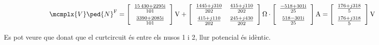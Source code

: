 \begin{exemple}
    \[
    \mcmplx{V}\ped{N}^{\text{F}} =
    \begin{bmatrix}\begin{array}{c}
    \frac{\complexnum{15430+j2295}}{101} \\[2mm]
    \frac{\complexnum{3390+j2085}}{101}
	\end{array}\end{bmatrix}\unit{V} +
	\begin{bmatrix}\begin{array}{cc}
         \frac{1445 + j 310}{202} & \frac{415 + j 110}{202} \\[2mm]
         \frac{415 + j 110}{202} & \frac{245 + j 430}{202}
    \end{array}\end{bmatrix}\unit{\ohm} \cdot
    \begin{bmatrix}\begin{array}{c}
        \frac{\complexnum{-518+j301}}{25} \\[2mm]
        \frac{\complexnum{518-j301}}{25}
	\end{array}\end{bmatrix}\unit{A}
 =
    \begin{bmatrix}\begin{array}{c}
        \frac{176 + j 318}{5} \\[2mm]
        \frac{176 + j 318}{5}
    \end{array}\end{bmatrix}\unit{V}
	\]

Es pot veure que donat que el curtcircuit és entre els nusos 1 i 2, llur potencial és idèntic.


\end{exemple}
